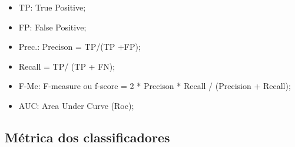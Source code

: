\begin{itemize}
	\item TP: True Positive;
	\item FP: False Positive;
	\item Prec.: Precison = TP/(TP +FP);
	\item Recall = TP/ (TP + FN);
	\item F-Me: F-measure ou f-score = 2 * Precison * Recall / (Precision + Recall);
	\item AUC: Area Under Curve (Roc);
\end{itemize}
    
\subsection{Métrica dos classificadores}


